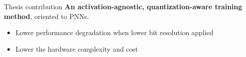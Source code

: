 \begin{frame}{Thesis contribution}
    \textbf{An activation-agnostic, quantization-aware training
      method}, oriented to PNNs. 
    \begin{itemize}
        \item \textcolor{mygreen}{Lower performance degradation when lower bit resolution applied} 
        \item \textcolor{mygreen}{Lower the hardware complexity and cost}
    \end{itemize}
    
\end{frame}
    




    
